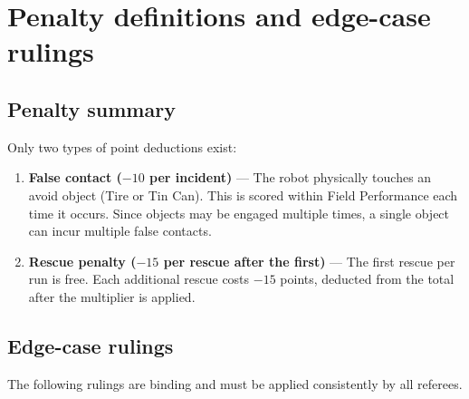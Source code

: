 \documentclass[a4]{article}
\begin{document}
\section*{Penalty definitions and edge-case rulings}
\subsection*{Penalty summary}

Only two types of point deductions exist:

\begin{enumerate}
    \item \textbf{False contact ($-10$ per incident)} --- The robot physically touches an avoid object (Tire or Tin Can). This is scored within Field Performance each time it occurs. Since objects may be engaged multiple times, a single object can incur multiple false contacts.
    \item \textbf{Rescue penalty ($-15$ per rescue after the first)} --- The first rescue per run is free. Each additional rescue costs $-15$ points, deducted from the total after the multiplier is applied.
\end{enumerate}

\subsection*{Edge-case rulings}

The following rulings are binding and must be applied consistently by all referees.
\end{document}
